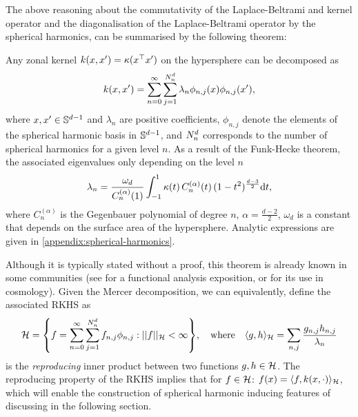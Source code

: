 The above reasoning about the commutativity of the Laplace-Beltrami and kernel operator and the diagonalisation of the Laplace-Beltrami operator by the spherical harmonics, can be summarised by the following theorem:
\begin{theorem}
    \label{theorem:mercer-zonal}
Any zonal kernel $k(x, x') = \kappa(x^{\top} x')$ on the hypersphere can be decomposed as
\begin{equation}
\label{eq:kernel-form}
    k(x, x') = \sum_{n=0}^{\infty} \sum_{j=1}^{N^d_n} \lambda_{n} \phi_{n,j}(x) \phi_{n,j}(x'),
\end{equation}
where $x,x' \in \mathbb{S}^{d-1}$ and $\lambda_{n}$ are positive coefficients, $\phi_{n,j}$ denote the elements of the spherical harmonic basis in $\mathbb{S}^{d-1}$, and $N^d_n$ corresponds to the number of spherical harmonics for a given level $n$. As a result of the Funk-Hecke theorem, the associated eigenvalues only depending on the level $n$
\begin{equation}
    \label{eq:compute-eigenvalues}
        \lambda_{n} = \frac{\omega_{d}}{C_n^{(\alpha)}(1)} \int_{-1}^1 \kappa(t)\,C_n^{(\alpha)}(t)\,(1 - t^2)^{\frac{d-3}{2}} \mathrm{d}{t},
\end{equation} 
where $C_n^{(\alpha)}$ is the Gegenbauer polynomial of degree $n$, $\alpha = \frac{d-2}{2}$, $\omega_d$ is a constant that depends on the surface area of the hypersphere. Analytic expressions are given in \cref{appendix:spherical-harmonics}.
\end{theorem}
Although it is typically stated without a proof, this theorem is already known in some communities (see \citet{wendland2005} for a functional analysis exposition, or \citet{peacock1999cosmological} for its use in cosmology). Given the Mercer decomposition, we can equivalently, define the associated RKHS as
\begin{equation}
    \label{eq:rkhs-sphere}
    \rkhs = \left\{
    f = 
    \sum_{n=0}^\infty \sum_{j=1}^{\dnumharmonicsforlevel} {f}_{n,j} \sh_{n, j}:
    \norm{f}_{\rkhs} < \infty
    \right\},
    \quad\text{where}\quad
    \langle g, h \rangle_{\rkhs} = 
    \sum_{n,j}
            \frac{{g}_{n, j} {h}_{n, j}}{\lambda_{n}}
\end{equation}
is the \emph{reproducing} inner product between two functions $g,h \in {\mathcal{H}}$. The reproducing property of the RKHS implies that for $f \in {\mathcal{H}}$: $f(x) = \langle f, k(x, \cdot) \rangle_{{\mathcal{H}}}$, which will enable the construction of spherical harmonic inducing features of discussing in the following section.

